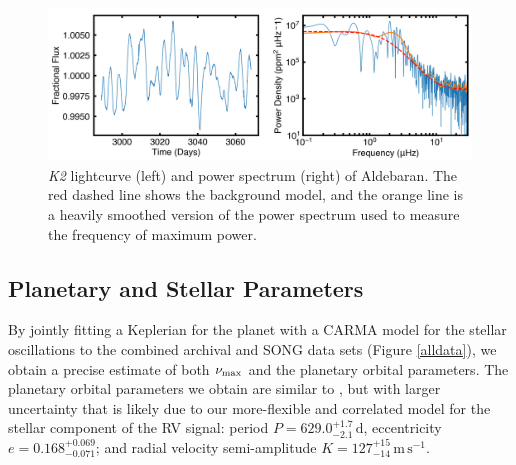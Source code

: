 \documentclass[modern]{aastex61}
\newcommand{\numax}{\mbox{$\nu_{\rm max}$}\xspace}
\newcommand{\ktwo}{\emph{K2}\xspace}
\newcommand{\twosidedrange}[3]{\ensuremath{#1^{+#2}_{-#3}}}
\newcommand{\PeriodRange}{\twosidedrange{629.0}{1.7}{2.1}}
\newcommand{\EccentricityRange}{\twosidedrange{0.168}{0.069}{0.071}}
\newcommand{\PlanetRVAmpRange}{\twosidedrange{127}{15}{14}}
\begin{document}
\begin{figure}
\centering
\includegraphics[width=\textwidth]{k2obs.png}
\caption{\ktwo lightcurve (left) and power spectrum (right) of Aldebaran. The red dashed line shows the background model, and the orange line is a heavily smoothed version of the power spectrum used to measure the frequency of maximum power. }
\label{k2_lightcurve}
\end{figure}

\subsection{Planetary and Stellar Parameters}

By jointly fitting a Keplerian for the planet with a CARMA model for the stellar
oscillations to the combined archival and SONG data sets (Figure \ref{alldata}),
we obtain a precise estimate of both \numax and the planetary orbital
parameters. The planetary orbital parameters we obtain are similar to
\citet{Hatzes2015}, but with larger uncertainty that is likely due to our
more-flexible and correlated model for the stellar component of the RV signal:
period $P = \PeriodRange \, \mathrm{d}$, eccentricity $e =
\EccentricityRange{}$; and radial velocity semi-amplitude $K =
\PlanetRVAmpRange{} \, \mathrm{m} \, \mathrm{s}^{-1}$.
\end{document}
